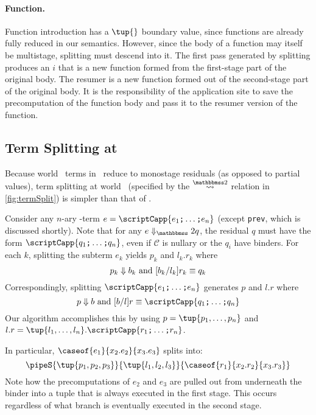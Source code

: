 \begin{abstrsyn}
\paragraph {Function.} 
Function introduction has a $\tup{}$ boundary value, since functions
are already fully reduced in our semantics.  However, since the body
of a function may itself be multistage, splitting must descend into
it.  The first pass generated by splitting produces an $i$ that is a new
function formed from the first-stage part of the original body.  The
resumer is a new function formed out of the second-stage part of the
original body.  It is the responsibility of the application site to
save the precomputation of the function body and pass it to the
resumer version of the function.

\subsection{Term Splitting at \bbtwo}

Because world \bbtwo\ terms in \lang\ reduce to monostage residuals
(as opposed to partial values), term splitting at world
\bbtwo\ (specified by the $\splittwosym$ relation in
\cref{fig:termSplit}) is simpler than that of \bbonem.

Consider any $n$-ary \bbtwo-term $e = \scriptCapp {e_1 \ttsemi \ldots
  \ttsemi e_n}$ (except \texttt{prev}, which is discussed shortly).
Note that for any $\diatwo e q$, the residual $q$ must have the form
$\scriptCapp {q_1 \ttsemi \ldots \ttsemi q_n}$, even if $\mathcal{C}$ is
nullary or the $q_i$ have binders.
For each $k$, splitting the subterm $e_k$ yields $p_k$ and $l_k.r_k$ where
\[
	{p_k} \Downarrow {b_k} \text{ and } [{b_k}/{l_k}]{r_k} \equiv {q_k}
\]
Correspondingly, splitting $\scriptCapp {e_1 \ttsemi \ldots \ttsemi e_n}$ generates $p$ and $l.r$ where
\[
	\reduce p b \text{ and } [b/l]r \equiv \scriptCapp {q_1 \ttsemi \ldots \ttsemi q_n}
\]
Our algorithm accomplishes this by using $p = \tup {p_1, \ldots, p_n}$ and
$l.r = \tup {l_1, \ldots, l_n}.\scriptCapp {r_1 \ttsemi \ldots \ttsemi r_n}$.

In particular, $\caseof{e_1}{x_2.e_2}{x_3.e_3}$ splits into:
\[
\pipeS {\tup{p_1,p_2,p_3}} {\tup{l_1,l_2,l_3}} {\caseof{r_1}{x_2.r_2}{x_3.r_3}}
\]
Note how the precomputations of $e_2$ and $e_3$ are pulled out from
underneath the binder into a tuple that is always executed in the
first stage. This occurs regardless of what branch is eventually
executed in the second stage.


\end{abstrsyn}
